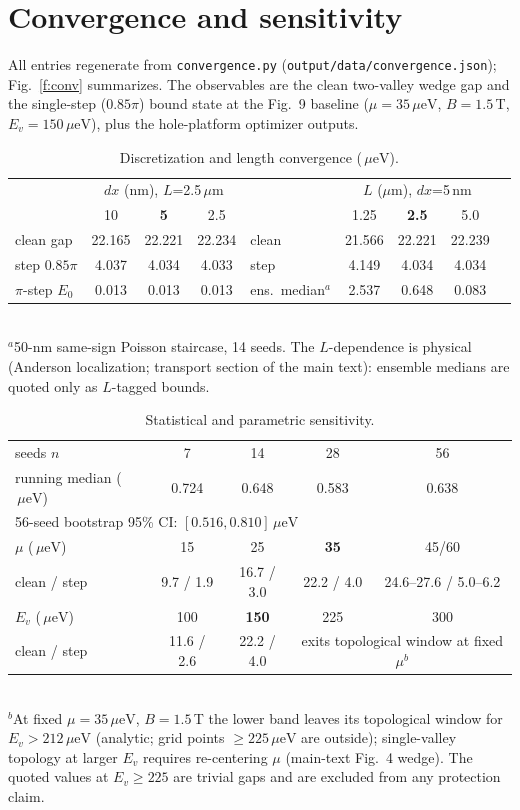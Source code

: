 \documentclass[11pt]{article}
\newcommand{\ueV}{\,\mu\mathrm{eV}}
\begin{document}
\section{Convergence and sensitivity}\label{s:conv}
All entries regenerate from \texttt{convergence.py}
(\texttt{output/data/convergence.json}); Fig.~\ref{f:conv} summarizes.
The observables are the clean
two-valley wedge gap and the single-step ($0.85\pi$) bound state at the
Fig.~9 baseline ($\mu = 35\ueV$, $B = 1.5$\,T, $E_v = 150\ueV$), plus the
hole-platform optimizer outputs.

\begin{table}[h]\centering\small
\caption{Discretization and length convergence ($\ueV$).}
\label{t:conv1}
\begin{tabular}{lccc|lcccc}
\toprule
& \multicolumn{3}{c|}{$dx$ (nm), $L$=2.5\,$\mu$m} &
& \multicolumn{3}{c}{$L$ ($\mu$m), $dx$=5\,nm} \\
& 10 & \textbf{5} & 2.5 & & 1.25 & \textbf{2.5} & 5.0\\
\midrule
clean gap & 22.165 & 22.221 & 22.234 & clean & 21.566 & 22.221 & 22.239\\
step $0.85\pi$ & 4.037 & 4.034 & 4.033 & step & 4.149 & 4.034 & 4.034\\
$\pi$-step $E_0$ & 0.013 & 0.013 & 0.013 & ens.\ median$^a$ & 2.537 & 0.648 & 0.083\\
\bottomrule
\end{tabular}\\
\smallskip
{\footnotesize $^a$50-nm same-sign Poisson staircase, 14 seeds. The
$L$-dependence is physical (Anderson localization; transport section of
the main text): ensemble medians are quoted only as $L$-tagged bounds.}
\end{table}

\begin{table}[h]\centering\small
\caption{Statistical and parametric sensitivity.}
\label{t:conv2}
\begin{tabular}{lcccc}
\toprule
seeds $n$ & 7 & 14 & 28 & 56\\
running median ($\ueV$) & 0.724 & 0.648 & 0.583 & 0.638\\
\multicolumn{5}{l}{56-seed bootstrap 95\% CI: $[0.516, 0.810]\ueV$}\\
\midrule
$\mu$ ($\ueV$) & 15 & 25 & \textbf{35} & 45/60\\
clean / step & 9.7 / 1.9 & 16.7 / 3.0 & 22.2 / 4.0 & 24.6--27.6 / 5.0--6.2\\
\midrule
$E_v$ ($\ueV$) & 100 & \textbf{150} & 225 & 300\\
clean / step & 11.6 / 2.6 & 22.2 / 4.0 & \multicolumn{2}{c}{exits topological
window at fixed $\mu$$^b$}\\
\bottomrule
\end{tabular}\\
\smallskip
{\footnotesize $^b$At fixed $\mu = 35\ueV$, $B = 1.5$\,T the lower band
leaves its topological window for $E_v > 212\ueV$ (analytic; grid points
$\ge 225\ueV$ are outside); single-valley
topology at larger $E_v$ requires re-centering $\mu$ (main-text Fig.~4
wedge). The quoted values at $E_v \ge 225$ are trivial gaps and are
excluded from any protection claim.}
\end{table}
\end{document}
